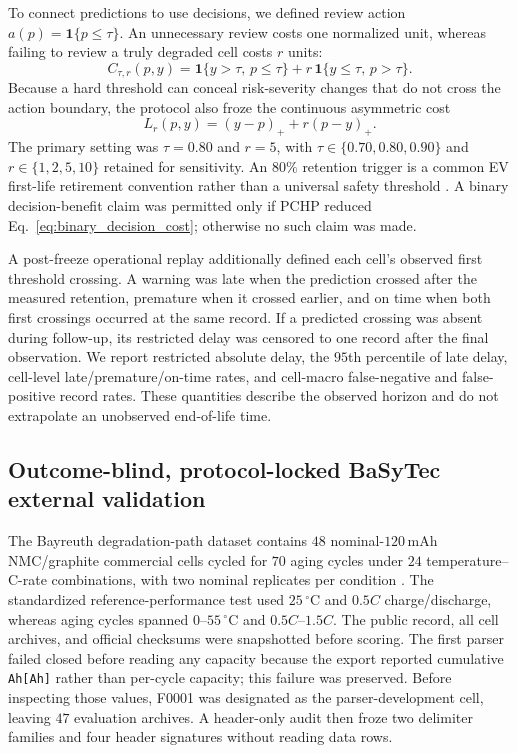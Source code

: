\documentclass[preprint,12pt]{elsarticle}
\begin{document}
To connect predictions to use decisions, we defined review action $a(p)=\mathbf 1\{p\leq\tau\}$. An unnecessary review costs one normalized unit, whereas failing to review a truly degraded cell costs $r$ units:
\begin{equation}
C_{\tau,r}(p,y)=\mathbf 1\{y>\tau,\,p\leq\tau\}
+r\,\mathbf 1\{y\leq\tau,\,p>\tau\}.
\label{eq:binary_decision_cost}
\end{equation}
Because a hard threshold can conceal risk-severity changes that do not cross the action boundary, the protocol also froze the continuous asymmetric cost
\begin{equation}
L_r(p,y)=(y-p)_{+}+r(p-y)_{+}.
\label{eq:continuous_decision_cost}
\end{equation}
The primary setting was $\tau=0.80$ and $r=5$, with $\tau\in\{0.70,0.80,0.90\}$ and $r\in\{1,2,5,10\}$ retained for sensitivity. An $80\%$ retention trigger is a common EV first-life retirement convention rather than a universal safety threshold \citep{saxena2015eol,montes2022secondlife}. A binary decision-benefit claim was permitted only if PCHP reduced Eq.~\eqref{eq:binary_decision_cost}; otherwise no such claim was made.

A post-freeze operational replay additionally defined each cell's observed first threshold crossing. A warning was late when the prediction crossed after the measured retention, premature when it crossed earlier, and on time when both first crossings occurred at the same record. If a predicted crossing was absent during follow-up, its restricted delay was censored to one record after the final observation. We report restricted absolute delay, the $95$th percentile of late delay, cell-level late/premature/on-time rates, and cell-macro false-negative and false-positive record rates. These quantities describe the observed horizon and do not extrapolate an unobserved end-of-life time.

\subsection{Outcome-blind, protocol-locked BaSyTec external validation}

The Bayreuth degradation-path dataset contains $48$ nominal-$120\,\mathrm{mAh}$ NMC/graphite commercial cells cycled for $70$ aging cycles under $24$ temperature--C-rate combinations, with two nominal replicates per condition \citep{ramasubramanian2025degradation,roder2025degradationdata}. The standardized reference-performance test used $25\,^{\circ}\mathrm{C}$ and $0.5C$ charge/discharge, whereas aging cycles spanned $0$--$55\,^{\circ}\mathrm{C}$ and $0.5C$--$1.5C$. The public record, all cell archives, and official checksums were snapshotted before scoring. The first parser failed closed before reading any capacity because the export reported cumulative \texttt{Ah[Ah]} rather than per-cycle capacity; this failure was preserved. Before inspecting those values, F0001 was designated as the parser-development cell, leaving $47$ evaluation archives. A header-only audit then froze two delimiter families and four header signatures without reading data rows.
\end{document}
